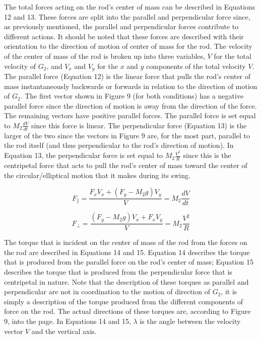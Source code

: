 \documentclass[%
 aip,
 amsmath,amssymb,
 reprint,%
 floatfix,%
]{revtex4-1}
\begin{document}
The total forces acting on the rod's center of mass can be described in Equations 12 and 13. These forces are split into the parallel and perpendicular force since, as previously mentioned, the parallel and perpendicular forces contribute to different actions. It should be noted that these forces are described with their orientation to the direction of motion of center of mass for the rod. The velocity of the center of mass of the rod is broken up into three variables, $V$ for the total velocity of $G_2$, and $V_x$ and $V_y$ for the $x$ and $y$ components of the total velocity $V$. The parallel force (Equation 12) is the linear force that pulls the rod's center of mass instantaneously backwards or forwards in relation to the direction of motion of $G_2$. The first vector shown in Figure 9 (for both conditions) has a negative parallel force since the direction of motion is away from the direction of the force. The remaining vectors have positive parallel forces. The parallel force is set equal to $M_2 \frac{dV}{dt}$ since this force is linear. The perpendicular force (Equation 13) is the larger of the two since the vectors in Figure 9 are, for the most part, parallel to the rod itself (and thus perpendicular to the rod's direction of motion). In Equation 13, the perpendicular force is set equal to $M_2 \frac{V^2}{R}$ since this is the centripetal force that acts to pull the rod's center of mass toward the center of the circular/elliptical motion that it makes during its swing.

\begin{equation}
	F_{\parallel}=\frac{F_x V_x + (F_y - M_2 g) V_y}{V} = M_2 \frac{dV}{dt}
\end{equation}

\begin{equation}
	F_{\perp}=\frac{(F_y - M_2 g)V_x+ F_x V_y}{V} = M_2 \frac{V^2}{R}
\end{equation}

The torque that is incident on the center of mass of the rod from the forces on the rod are described in Equations 14 and 15. Equation 14 describes the torque that is produced from the parallel force on the rod's center of mass; Equation 15 describes the torque that is produced from the perpendicular force that is centripetal in nature. Note that the description of these torques as parallel and perpendicular are not in coordination to the motion of direction of $G_2$, it is simply a description of the torque produced from the different components of force on the rod. The actual directions of these torques are, according to Figure 9, into the page. In Equations 14 and 15, $\lambda$ is the angle between the velocity vector $V$ and the vertical axis.
\end{document}
